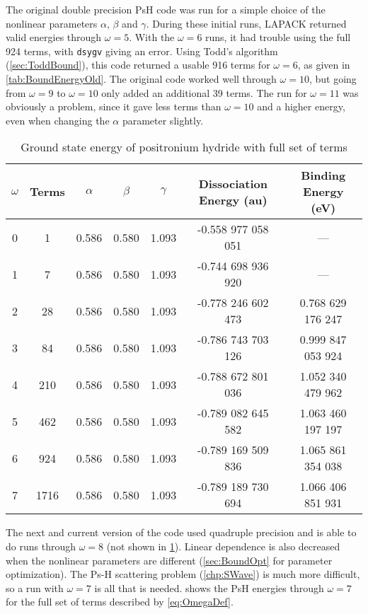 \documentclass[Dissertation.tex]{subfiles}
\begin{document}
The original double precision PsH code was run for a simple choice of the nonlinear parameters $\alpha$, $\beta$ and $\gamma$. During these initial runs, LAPACK returned valid energies through $\omega = 5$. With the $\omega = 6$ runs, it had trouble using the full 924 terms, with \texttt{dsygv} giving an error. Using Todd's algorithm (\cref{sec:ToddBound}), this code returned a usable 916 terms for $\omega = 6$, as given in \cref{tab:BoundEnergyOld}. The original code worked well through $\omega = 10$, but going from $\omega = 9$ to $\omega = 10$ only added an additional 39 terms. The run for $\omega = 11$ was obviously a problem, since it gave less terms than $\omega = 10$ and a higher energy, even when changing the $\alpha$ parameter slightly.

\setlength{\abovecaptionskip}{6pt}   %
\setlength{\belowcaptionskip}{6pt}   %
\begin{table}[H]
\centering
\begin{tabular}{c c c c c c c}
\toprule
$\omega$ & Terms & $\alpha$ & $\beta$ & $\gamma$ & Dissociation Energy (au) & Binding Energy (eV) \\ [0.5ex]
\midrule
0 & 1 & 0.586 & 0.580 & 1.093 & -0.558 977 058 051 & --- \\
1 & 7 & 0.586 & 0.580 & 1.093 & -0.744 698 936 920 & --- \\
2 & 28 & 0.586 & 0.580 & 1.093 & -0.778 246 602 473 & 0.768 629 176 247 \\
3 & 84 & 0.586 & 0.580 & 1.093 & -0.786 743 703 126 & 0.999 847 053 924 \\
4 & 210 & 0.586 & 0.580 & 1.093 & -0.788 672 801 036 & 1.052 340 479 962 \\
5 & 462 & 0.586 & 0.580 & 1.093 & -0.789 082 645 582 & 1.063 460 197 197 \\
6 & 924 & 0.586 & 0.580 & 1.093 & -0.789 169 509 836 & 1.065 861 354 038 \\
7 & 1716 & 0.586 & 0.580 & 1.093 & -0.789 189 730 694 & 1.066 406 851 931 \\
\bottomrule
\end{tabular}
\caption{Ground state energy of positronium hydride with full set of terms} %
\label{tab:BoundEnergy1}
\end{table}

The next and current version of the code used quadruple precision and is able to do runs through $\omega = 8$ (not shown in \cref{tab:BoundEnergy1}). Linear dependence is also decreased when the nonlinear parameters are different (\cref{sec:BoundOpt} for parameter optimization). The Ps-H scattering problem (\cref{chp:SWave}) is much more difficult, so a run with $\omega = 7$ is all that is needed.  shows the PsH energies through $\omega = 7$ for the full set of terms described by \cref{eq:OmegaDef}.
\end{document}
